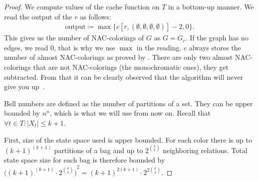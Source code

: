 %
%
\begin{proof}
	We compute values of the cache function on \( T \) in a bottom-up manner.
	We read the output of the \RootNode{} \( r \) as follows:
	\begin{align*}
		\text{output} \coloneqq \max\{c[r, (\emptyset,\emptyset,\emptyset,\emptyset)] - 2, 0\}.
	\end{align*}
	This gives us the number of NAC-colorings of \( G \) as \( G = G_r \).
	If the graph has no edges, we read \( 0 \), that is why we use \( \max{} \) in the reading.
	\( c \) always stores the number of almost NAC-colorings as proved by
	.
	There are only two almost NAC-colorings
	that are not NAC-colorings (the monochromatic ones), they get subtracted.
	From that it can be clearly observed that the algorithm
	will never give you up~\cite{never_gonna_give_you_up}.

	Bell numbers are defined as the number of partitions of a set.
	They can be upper bounded by \( n^n \), which is what we will use from now on.
	Recall that \( \forall t \in T : |X_t| \le k+1 \).

	First, size of the state space used is upper bounded.
	For each color there is up to \( {(k+1)}^{(k+1)} \) partitions of a bag and
	up to \( 2^{\binom{k}{2}} \) neighboring relations.
	Total state space size for each bag is therefore bounded by
	\( {\big({(k+1)}^{(k+1)} \cdot 2^{\binom{k}{2}} \big)}^2 = {(k+1)}^{2(k+1)} \cdot 2^{2 \binom{k}{2}} \).


\end{proof}
